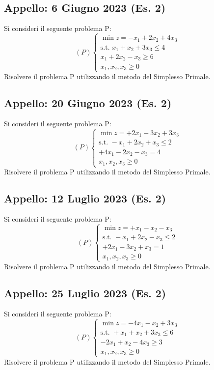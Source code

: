 \documentclass[11pt, a4paper]{article}
\begin{document}
\subsection{Appello: 6 Giugno 2023 (Es. 2)}
Si consideri il seguente problema P:
\[ (P) \begin{cases} \min z = -x_1 + 2x_2 + 4x_3 \\ \text{s.t. } x_1 + x_2 + 3x_3 \le 4 \\ x_1 + 2x_2 - x_3 \ge 6 \\ x_1, x_2, x_3 \ge 0 \end{cases} \]
Risolvere il problema P utilizzando il metodo del Simplesso Primale.

\subsection{Appello: 20 Giugno 2023 (Es. 2)}
Si consideri il seguente problema P:
\[ (P) \begin{cases} \min z = +2x_1 - 3x_2 + 3x_3 \\ \text{s.t. } -x_1 + 2x_2 + x_3 \le 2 \\ +4x_1 - 2x_2 - x_3 = 4 \\ x_1, x_2, x_3 \ge 0 \end{cases} \]
Risolvere il problema P utilizzando il metodo del Simplesso Primale.

\subsection{Appello: 12 Luglio 2023 (Es. 2)}
Si consideri il seguente problema P:
\[ (P) \begin{cases} \min z = +x_1 - x_2 - x_3 \\ \text{s.t. } -x_1 + 2x_2 - x_3 \le 2 \\ +2x_1 - 3x_2 + x_3 = 1 \\ x_1, x_2, x_3 \ge 0 \end{cases} \]
Risolvere il problema P utilizzando il metodo del Simplesso Primale.

\subsection{Appello: 25 Luglio 2023 (Es. 2)}
Si consideri il seguente problema P:
\[ (P) \begin{cases} \min z = -4x_1 - x_2 + 3x_3 \\ \text{s.t. } +x_1 + x_2 + 3x_3 \le 6 \\ -2x_1 + x_2 - 4x_3 \ge 3 \\ x_1, x_2, x_3 \ge 0 \end{cases} \]
Risolvere il problema P utilizzando il metodo del Simplesso Primale.
\end{document}
